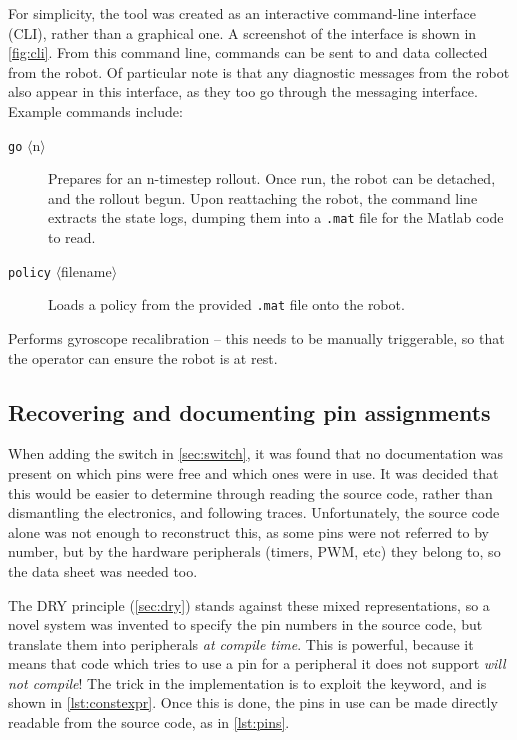 \documentclass[main.tex]{subfiles}
\begin{document}
		For simplicity, the tool was created as an interactive command-line interface (CLI), rather than a graphical one.
		A screenshot of the interface is shown in \cref{fig:cli}.
		From this command line, commands can be sent to and data collected from the robot.
		Of particular note is that any diagnostic messages from the robot also appear in this interface, as they too go through the messaging interface. Example commands include:
		\begin{description}
			\item[\texttt{go} $\langle$n$\rangle$]
				Prepares for an n-timestep rollout. Once run, the robot can be detached, and the rollout begun. Upon reattaching the robot, the command line extracts the state logs, dumping them into a \texttt{.mat} file for the {\Pilco} Matlab code to read.
			\item[\texttt{policy}  $\langle$filename$\rangle$]
				Loads a policy from the provided \texttt{.mat} file onto the robot.
		\end{description}

		\begin{description}[topsep = \itemsep]
			\item[\texttt{calibrate}]
				Performs gyroscope recalibration -- this needs to be manually triggerable, so that the operator can ensure the robot is at rest.
		\end{description}

\subsection{Recovering and documenting pin assignments}
	\label{sec:pins}

	When adding the switch in \cref{sec:switch}, it was found  that no documentation was present on which pins were free and which ones were in use.
	It was decided that this would be easier to determine through reading the source code, rather than dismantling the electronics, and following traces.
	Unfortunately, the source code alone was not enough to reconstruct this, as some pins were not referred to by number, but by the hardware peripherals (timers, PWM, etc) they belong to, so the data sheet was needed too.

	The DRY principle (\cref{sec:dry}) stands against these mixed representations, so a novel system was invented to specify the pin numbers in the source code, but translate them into peripherals \emph{at compile time}.
	This is powerful, because it means that code which tries to use a pin for a peripheral it does not support \emph{will not compile}! The trick in the implementation is to exploit the  keyword, and is shown in \cref{lst:constexpr}.
	Once this is done, the pins in use can be made directly readable from the source code, as in \cref{lst:pins}.
\end{document}
